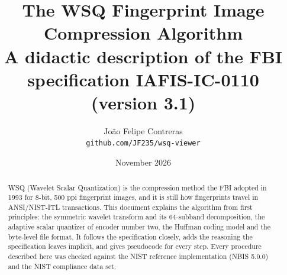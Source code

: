 \documentclass[11pt,a4paper]{article}
\title{The WSQ Fingerprint Image Compression Algorithm\\[0.4em]
  \large A didactic description of the FBI specification IAFIS-IC-0110 (version 3.1)}
\author{João Felipe Contreras\\\small\texttt{github.com/JF235/wsq-viewer}}
\date{November 2026}
\begin{document}
\maketitle

\begin{abstract}
\noindent
WSQ (Wavelet Scalar Quantization) is the compression method the FBI adopted in 1993 for
8-bit, 500 ppi fingerprint images, and it is still how fingerprints travel in ANSI/NIST-ITL
transactions. This document explains the algorithm from first principles: the symmetric
wavelet transform and its 64-subband decomposition, the adaptive scalar quantizer of
encoder number two, the Huffman coding model and the byte-level file format. It follows
the specification closely, adds the reasoning the specification leaves implicit, and gives
pseudocode for every step. Every procedure described here was checked against the NIST
reference implementation (NBIS 5.0.0) and the NIST compliance data set.
\end{abstract}

\tableofcontents











\end{document}
